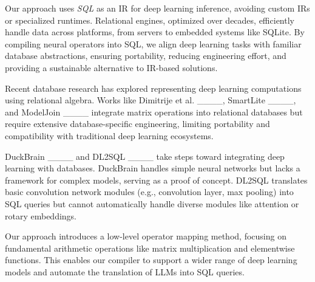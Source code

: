Our approach uses \emph{SQL} as an IR for deep learning inference, avoiding custom IRs or specialized runtimes. Relational engines, optimized over decades, efficiently handle data across platforms, from servers to embedded systems like SQLite. By compiling neural operators into SQL, we align deep learning tasks with familiar database abstractions, ensuring portability, reducing engineering effort, and providing a sustainable alternative to IR-based solutions.


Recent database research has explored representing deep learning computations using relational algebra. Works like Dimitrije et al. ____, SmartLite ____, and ModelJoin ____ integrate matrix operations into relational databases but require extensive database-specific engineering, limiting portability and compatibility with traditional deep learning ecosystems.

DuckBrain ____ and DL2SQL ____ take steps toward integrating deep learning with databases. DuckBrain handles simple neural networks but lacks a framework for complex models, serving as a proof of concept. DL2SQL translates basic convolution network modules (e.g., convolution layer, max pooling) into SQL queries but cannot automatically handle diverse modules like attention or rotary embeddings.

Our approach introduces a low-level operator mapping method, focusing on fundamental arithmetic operations like matrix multiplication and elementwise functions. This enables our compiler to support a wider range of deep learning models and automate the translation of LLMs into SQL queries.